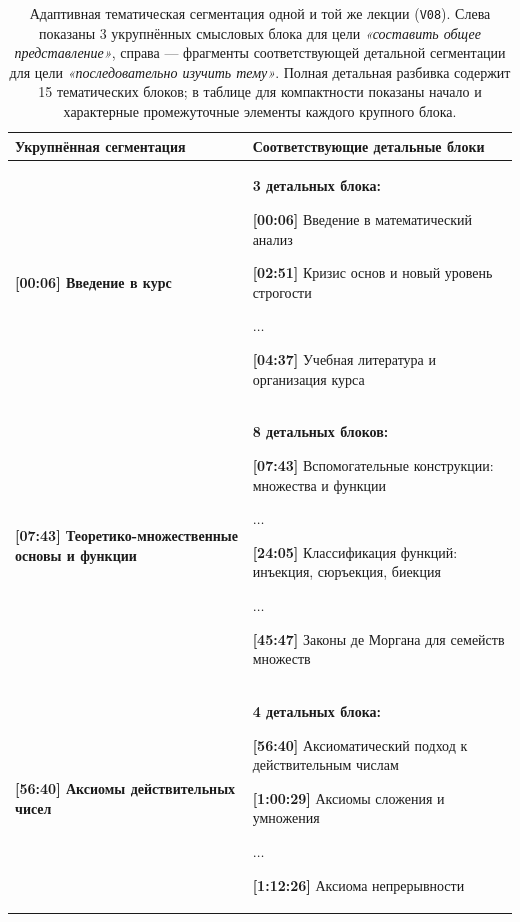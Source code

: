 \begin{table}[h]
\centering
\footnotesize
\renewcommand{\arraystretch}{1.25}
\begin{tabular}{m{} m{}}
\toprule
\textbf{Укрупнённая сегментация} & \textbf{Соответствующие детальные блоки} \\
\midrule

\centering\arraybackslash
\textbf{[00:06] Введение в курс}
&
\textbf{3 детальных блока:}\par
\textbf{[00:06]} Введение в математический анализ\par
\textbf{[02:51]} Кризис основ и новый уровень строгости\par
\(\ldots\)\par
\textbf{[04:37]} Учебная литература и организация курса
\\

\midrule

\centering\arraybackslash
\textbf{[07:43] Теоретико-множественные основы и функции}
&
\textbf{8 детальных блоков:}\par
\textbf{[07:43]} Вспомогательные конструкции: множества и функции\par
\(\ldots\)\par
\textbf{[24:05]} Классификация функций: инъекция, сюръекция, биекция\par
\(\ldots\)\par
\textbf{[45:47]} Законы де Моргана для семейств множеств
\\

\midrule

\centering\arraybackslash
\textbf{[56:40] Аксиомы действительных чисел}
&
\textbf{4 детальных блока:}\par
\textbf{[56:40]} Аксиоматический подход к действительным числам\par
\textbf{[1:00:29]} Аксиомы сложения и умножения\par
\(\ldots\)\par
\textbf{[1:12:26]} Аксиома непрерывности
\\

\bottomrule
\end{tabular}

\caption{Адаптивная тематическая сегментация одной и той же лекции (\texttt{V08}).
Слева показаны 3 укрупнённых смысловых блока для цели
\textit{«составить общее представление»}, справа — фрагменты
соответствующей детальной сегментации для цели
\textit{«последовательно изучить тему»}. Полная детальная разбивка
содержит 15 тематических блоков; в таблице для компактности показаны
начало и характерные промежуточные элементы каждого крупного блока.}
\label{tab:segmentation-comparison}
\end{table}

